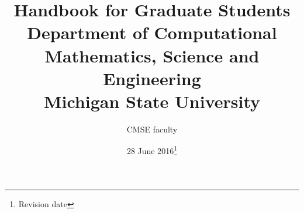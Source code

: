\documentclass[12pt]{article}
\begin{document}
\vspace{-50mm}
\title{Handbook for Graduate Students\\
\vspace{20mm}
  \large Department of Computational Mathematics, Science and
  Engineering\\
\vspace{20mm}
Michigan State University
\vspace{50mm}
}

\author{CMSE faculty}

\date{28 June 2016\footnote{Revision date}}

\maketitle

\newpage

\tableofcontents

\newpage






































\end{document}
